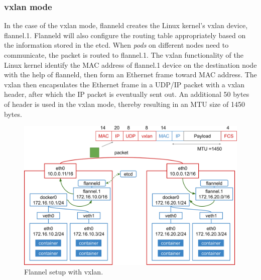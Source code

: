 \FloatBarrier

\subsubsection{vxlan mode}

In the case of the vxlan mode, flanneld creates the Linux kernel's vxlan device, flannel.1. 
Flanneld will also configure the routing table appropriately based on the information stored in the etcd.
When {\em pods} on different nodes need to communicate, the packet is routed to flannel.1.
The vxlan functionality of the Linux kernel identify the MAC address of flannel.1 device on the destination node with the help of flanneld, then form an Ethernet frame toward  MAC address.
The vxlan then encapsulates the Ethernet frame in a UDP/IP packet with a vxlan header, after which the IP packet is eventually sent out.
An additional 50 bytes of header is used in the vxlan mode, thereby resulting in an MTU size of 1450 bytes.

\begin{figure}[h]
  \centering
  \includegraphics[width=0.95\columnwidth]{Figs/flannel-vxlan}

  \par\bigskip
  \centering
  \begin{minipage}{0.9\columnwidth}
    \caption[Flannel setup with vxlan]{
      Flannel setup with vxlan.
    }
    \label{Figs/flannel-vxlan}
  \end{minipage}
\end{figure}

